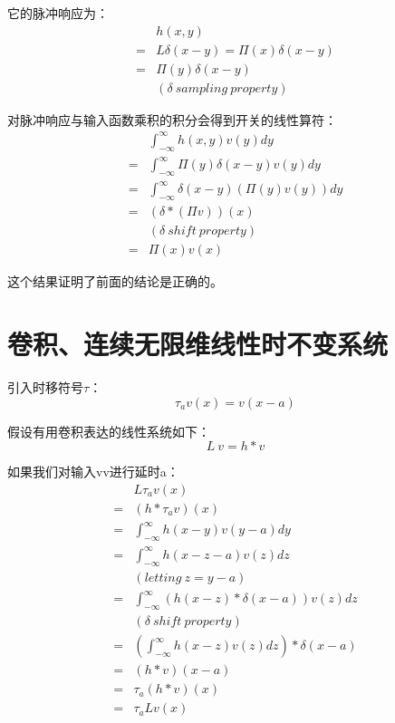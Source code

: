 它的脉冲响应为：
\begin{align*}
	  & h(x,y)                           \\
	= & L\delta(x-y) = \Pi(x)\delta(x-y) \\
	= & \Pi(y)\delta(x-y)                \\
	  & (\delta\ sampling\ property)
\end{align*}

对脉冲响应与输入函数乘积的积分会得到开关的线性算符：
\begin{align*}
	  & \int_{-\infty}^{\infty}h(x,y)v(y)dy                            \\
	= & \int_{-\infty}^{\infty}\Pi(y)\delta(x-y)v(y)dy                 \\
	= & \int_{-\infty}^{\infty}\delta(x-y)\left( \Pi(y)v(y) \right )dy \\
	= & \left(\delta * (\Pi v) \right )(x)                             \\
	  & (\delta\ shift\ property)                                      \\
	= & \Pi(x)v(x)
\end{align*}

这个结果证明了前面的结论是正确的。
\section{卷积、连续无限维线性时不变系统}
引入时移符号$\tau$：
$$
	\tau_a v(x) = v(x-a)
$$

假设有用卷积表达的线性系统如下：
$$
	L\ v = h*v
$$

如果我们对输入vv进行延时a：
\begin{align*}
	  & L\tau_a v(x)                                                   \\
	= & (h*\tau_av)(x)                                                 \\
	= & \int_{-\infty}^{\infty}h(x-y)v(y-a)dy                          \\
	= & \int_{-\infty}^{\infty}h(x-z-a)v(z)dz                          \\
	  & (letting\ z=y-a)                                               \\
	= & \int_{-\infty}^{\infty}\left(h(x-z)*\delta(x-a) \right )v(z)dz \\
	  & (\delta\ shift\ property)                                      \\
	= & \left(\int_{-\infty}^{\infty}h(x-z)v(z)dz \right )*\delta(x-a) \\
	= & (h*v)(x-a)                                                     \\
	= & \tau_a(h*v)(x)                                                 \\
	= & \tau_aLv(x)
\end{align*}

